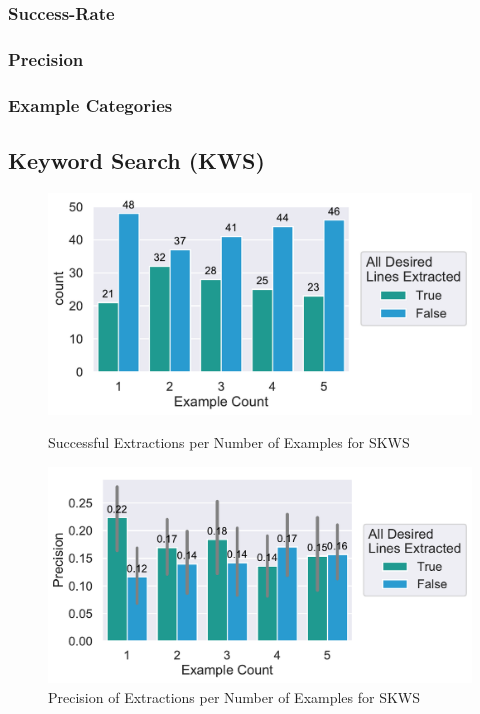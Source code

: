 \documentclass[\myrootdir/main.tex]{subfiles}
\begin{document}
\subsubsection{Success-Rate}
\subsubsection{Precision}
\subsubsection{Example Categories}


\subsection{Keyword Search (KWS)}

\begin{figure}[htbp]
	\centering
	\begin{minipage}{0.45\textwidth}
		\centering
		\includegraphics[width=\textwidth, clip]{img/big-study/success-examples-SKWS.pdf}
		\caption{Successful Extractions per Number of Examples for SKWS}
		\label{fig:success-examples-skws}
	\end{minipage}\hfill
	\begin{minipage}{0.45\textwidth}
		\centering
		\includegraphics[width=\textwidth, clip]{img/big-study/precision-SKWS.pdf}
		\caption{Precision of Extractions per Number of Examples for SKWS}
		\label{fig:precision-skws}
	\end{minipage}
\end{figure}
\end{document}
